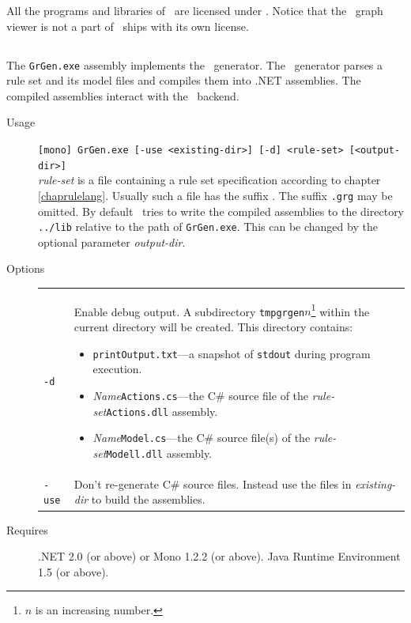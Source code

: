 All the programs and libraries of \GrG\ are licensed under . Notice that the \yComp\ graph viewer is not a part of \GrG\; \yComp\ ships with its own license.

\subsection{\texttt{}}
The \texttt{GrGen.exe} assembly implements the \GrG\ generator. The \GrG\ generator parses a rule set and its model files and compiles them into .NET assemblies. The compiled assemblies interact with the \GrG\ backend.
\begin{description}
  \item[Usage] \texttt{[mono] GrGen.exe [-use <existing-dir>] [-d] <rule-set> [<output-dir>]}\\
    \emph{rule-set} is a file containing a rule set specification according to chapter \ref{chaprulelang}. Usually such a file has the suffix \texttt{}. The suffix \texttt{.grg} may be omitted.
By default \GrG\ tries to write the compiled assemblies to the directory \texttt{../lib} relative to the path of \texttt{GrGen.exe}. This can be changed by the optional parameter \emph{output-dir}.
  \item[Options] \mbox{} 
    \begin{tabularx}{\linewidth}{lX}
      \texttt{-d} & Enable debug output. A subdirectory \texttt{tmpgrgen$n$}\footnote{$n$ is an increasing number.} within the current directory will be created. This directory contains:
\begin{itemize}
  \item \texttt{printOutput.txt}---a snapshot of \texttt{stdout} during program execution.
  \item \emph{Name}\texttt{Actions.cs}---the C\# source file of the \emph{rule-set}\texttt{Actions.dll} assembly.
  \item \emph{Name}\texttt{Model.cs}---the C\# source file(s) of the \emph{rule-set}\texttt{Modell.dll} assembly.
\end{itemize}\\
      \texttt{-use} & Don't re-generate C\# source files. Instead use the files in \emph{existing-dir} to build the assemblies.	
    \end{tabularx}
  \item[Requires] .NET 2.0 (or above) or Mono 1.2.2 (or above). Java Runtime Environment 1.5 (or above).
\end{description}

